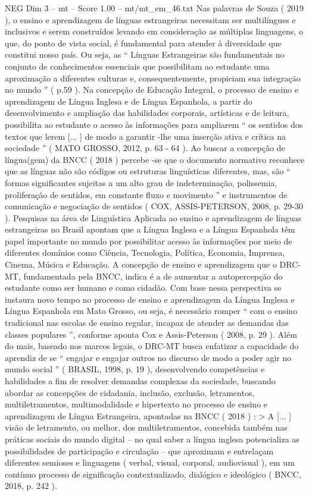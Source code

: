\begin{textsample}{NEG Dim 3 – mt – Score 1.00 – mt/mt\_em\_46.txt}  \label{ex:f3_neg_215}
Nas palavras de Souza ( 2019 ), o ensino e aprendizagem de línguas estrangeiras necessitam ser multilíngues e inclusivos e serem construídos levando em consideração as múltiplas linguagens, o que, do ponto de vista social, é fundamental para atender à diversidade que constitui nosso país.
Ou seja, as “ Línguas Estrangeiras são fundamentais no conjunto de conhecimentos essenciais que possibilitam ao estudante uma aproximação a diferentes culturas e, consequentemente, propiciam sua integração no mundo ” ( p.59 ).
Na concepção de Educação Integral, o processo de ensino e aprendizagem de Língua Inglesa e de Língua Espanhola, a partir do desenvolvimento e ampliação das habilidades corporais, artísticas e de leitura, possibilita ao estudante o acesso às informações para ampliarem “ os sentidos dos textos que lerem [... ] de modo a garantir -lhe uma inserção ativa e crítica na sociedade ” ( MATO GROSSO, 2012, p. 63 - 64 ).
Ao buscar a concepção de língua(gem) da BNCC ( 2018 ) percebe -se que o documento normativo reconhece que as línguas não são códigos ou estruturas linguísticas diferentes, mas, são “ formas significantes sujeitas a um alto grau de indeterminação, polissemia, proliferação de sentidos, em constante fluxo e movimento ” e instrumentos de comunicação e negociação de sentidos ( COX, ASSIS-PETERSON, 2008, p. 29-30 ).
Pesquisas na área de Linguística Aplicada ao ensino e aprendizagem de línguas estrangeiras no Brasil apontam que a Língua Inglesa e a Língua Espanhola têm papel importante no mundo por possibilitar acesso às informações por meio de diferentes domínios como Ciência, Tecnologia, Política, Economia, Imprensa, Cinema, Música e Educação.
A concepção de ensino e aprendizagem que o DRC-MT, fundamentada pela BNCC, indica é a de aumentar a autopercepção do estudante como ser humano e como cidadão.
Com base nessa perspectiva se instaura novo tempo no processo de ensino e aprendizagem da Língua Inglesa e Língua Espanhola em Mato Grosso, ou seja, é necessário romper “ com o ensino tradicional nas escolas de ensino regular, incapaz de atender as demandas das classes populares ”, conforme aponta Cox e Assis-Peterson ( 2008, p. 29 ).
Além do mais, baseado nos marcos legais, o DRC-MT busca enfatizar a capacidade do aprendiz de se “ engajar e engajar outros no discurso de modo a poder agir no mundo social ” ( BRASIL, 1998, p. 19 ), desenvolvendo competências e habilidades a fim de resolver demandas complexas da sociedade, buscando abordar as concepções de cidadania, inclusão, exclusão, letramentos, multiletramentos, multimodalidade e hipertexto no processo de ensino e aprendizagem de Língua Estrangeira, apontadas na BNCC ( 2018 ) : > A [... ] visão de letramento, ou melhor, dos multiletramentos, concebida também nas práticas sociais do mundo digital – no qual saber a língua inglesa potencializa as possibilidades de participação e circulação – que aproximam e entrelaçam diferentes semioses e linguagens ( verbal, visual, corporal, audiovisual ), em um contínuo processo de significação contextualizado, dialógico e ideológico ( BNCC, 2018, p. 242 ).

\end{textsample}
